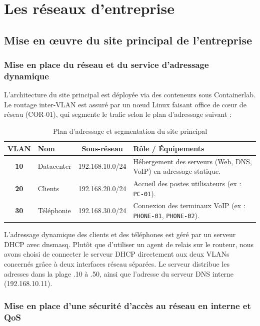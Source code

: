 \section{Les réseaux d'entreprise}
\subsection{Mise en œuvre du site principal de l'entreprise}

\subsubsection{Mise en place du réseau et du service d'adressage dynamique}

L'architecture du site principal est déployée via des conteneurs sous Containerlab. Le routage inter-VLAN est assuré par un nœud Linux faisant office de cœur de réseau (COR-01), qui segmente le trafic selon le plan d'adressage suivant :

\begin{table}[ht!]
    \centering
    \renewcommand{\arraystretch}{1.3}
    \begin{tabular}{|c|l|c|p{7.5cm}|}
        \hline
        \textbf{VLAN} & \textbf{Nom} & \textbf{Sous-réseau} & \textbf{Rôle / Équipements} \\
        \hline
        \textbf{10} & Datacenter & 192.168.10.0/24 & Hébergement des serveurs (Web, DNS, VoIP) en adressage statique. \\
        \hline
        \textbf{20} & Clients & 192.168.20.0/24 & Accueil des postes utilisateurs (ex : \texttt{PC-01}). \\
        \hline
        \textbf{30} & Téléphonie & 192.168.30.0/24 & Connexion des terminaux VoIP (ex : \texttt{PHONE-01}, \texttt{PHONE-02}). \\
        \hline
    \end{tabular}
    \caption{Plan d'adressage et segmentation du site principal}
    \label{tab:plan_adressage}
\end{table}

L'adressage dynamique des clients et des téléphones est géré par un serveur DHCP avec dnsmasq. Plutôt que d'utiliser un agent de relais sur le routeur, nous avons choisi de connecter le serveur DHCP directement aux deux VLANs concernés grâce à deux interfaces réseau séparées. Le serveur distribue les adresses dans la plage .10 à .50, ainsi que l'adresse du serveur DNS interne (192.168.10.11).

\subsubsection{Mise en place d'une sécurité d'accès au réseau en interne et QoS}

